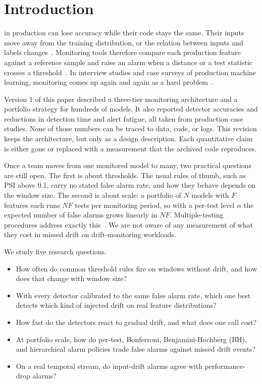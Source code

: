 \documentclass[journal]{IEEEtran}
\begin{document}
\IEEEpeerreviewmaketitle

\section{Introduction}
\label{sec:intro}

 in production can lose accuracy while their code stays the same. Their inputs move away from the training distribution, or the relation between inputs and labels changes~\cite{gama2014,lu2019,moreno2012}. Monitoring tools therefore compare each production feature against a reference sample and raise an alarm when a distance or a test statistic crosses a threshold~\cite{evidently,alibidetect,nannyml,klaise2020}. In interview studies and case surveys of production machine learning, monitoring comes up again and again as a hard problem~\cite{shankar2022,paleyes2022,amershi2019}.

Version 1 of this paper described a three-tier monitoring architecture and a portfolio strategy for hundreds of models. It also reported detector accuracies and reductions in detection time and alert fatigue, all taken from production case studies. None of those numbers can be traced to data, code, or logs. This revision keeps the architecture, but only as a design description. Each quantitative claim is either gone or replaced with a measurement that the archived code reproduces.

Once a team moves from one monitored model to many, two practical questions are still open. The first is about thresholds. The usual rules of thumb, such as PSI above 0.1, carry no stated false alarm rate, and how they behave depends on the window size. The second is about scale: a portfolio of $N$ models with $F$ features each runs $NF$ tests per monitoring period, so with a per-test level $\alpha$ the expected number of false alarms grows linearly in $NF$. Multiple-testing procedures address exactly this~\cite{dunn1961,benjamini1995,benjamini2001}. We are not aware of any measurement of what they cost in missed drift on drift-monitoring workloads.

We study five research questions.
\begin{itemize}[]
\item[RQ1:] How often do common threshold rules fire on windows without drift, and how does that change with window size?
\item[RQ2:] With every detector calibrated to the same false alarm rate, which one best detects which kind of injected drift on real feature distributions?
\item[RQ3:] How fast do the detectors react to gradual drift, and what does one call cost?
\item[RQ4:] At portfolio scale, how do per-test, Bonferroni, Benjamini-Hochberg (BH), and hierarchical alarm policies trade false alarms against missed drift events?
\item[RQ5:] On a real temporal stream, do input-drift alarms agree with performance-drop alarms?
\end{itemize}
\end{document}
